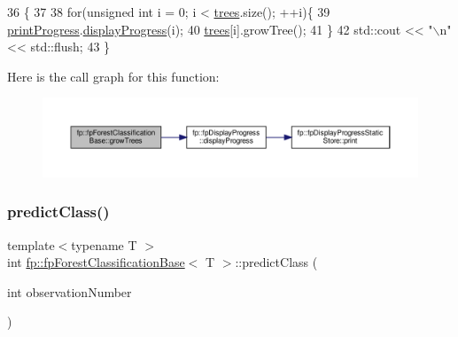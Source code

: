 \begin{DoxyCode}
36                             \{
37 
38                 \textcolor{keywordflow}{for}(\textcolor{keywordtype}{unsigned} \textcolor{keywordtype}{int} i = 0; i < \hyperlink{classfp_1_1fpForestClassificationBase_a51482a6c95c4b3cb42627f029c2d4662}{trees}.size(); ++i)\{
39                     \hyperlink{classfp_1_1fpForestClassificationBase_a21148775a113092d6929e0d28e351a2c}{printProgress}.\hyperlink{classfp_1_1fpDisplayProgress_adf5b2e390618d63eccb6de3b00eb857b}{displayProgress}(i);
40                     \hyperlink{classfp_1_1fpForestClassificationBase_a51482a6c95c4b3cb42627f029c2d4662}{trees}[i].growTree();
41                 \}
42                 std::cout << \textcolor{stringliteral}{"\(\backslash\)n"}<< std::flush;
43             \}
\end{DoxyCode}
Here is the call graph for this function\+:
\nopagebreak
\begin{figure}[H]
\begin{center}
\leavevmode
\includegraphics[width=350pt]{classfp_1_1fpForestClassificationBase_aea9db2571269f0f627226aa75ec4a694_cgraph}
\end{center}
\end{figure}
\mbox{\label{classfp_1_1fpForestClassificationBase_ad0c690fff971fab681467fbcd8762b5f}} 
\subsubsection{\texorpdfstring{predict\+Class()}{predictClass()}}
{\footnotesize\ttfamily template$<$typename T $>$ \\
int \hyperlink{classfp_1_1fpForestClassificationBase}{fp\+::fp\+Forest\+Classification\+Base}$<$ T $>$\+::predict\+Class (\begin{DoxyParamCaption}\item[{int}]{observation\+Number }\end{DoxyParamCaption})\hspace{0.3cm}{\ttfamily [inline]}}



